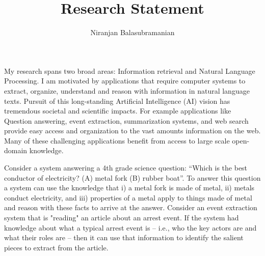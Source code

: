\documentclass[a4paper,11pt,onecolumn]{article}
\begin{document}

\title{Research Statement}
\author{Niranjan Balasubramanian}
\maketitle

My research spans two broad areas: Information retrieval and Natural Language Processing. I am motivated by applications that require computer systems to extract, organize, understand and reason with information in natural language texts. Pursuit of this long-standing Artificial Intelligence (AI) vision has tremendous societal and scientific impacts. For example applications like Question answering, event extraction, summarization systems, and web search provide easy access and organization to the vast amounts information on the web. Many of these challenging applications benefit from access to large scale open-domain knowledge.


Consider a system answering a 4th grade science question:  ``Which is the best conductor of electricity? (A) metal fork (B) rubber boat''. To answer this question a system can use the knowledge that i) a metal fork is made of metal, ii) metals conduct electricity, and iii) properties of a metal apply to things made of metal and reason with these facts to arrive at the answer. Consider an event extraction system that is "reading" an article about an arrest event. If the system had knowledge about what a typical arrest event is -- i.e., who the key actors are and what their roles are -- then it can use that information to identify the salient pieces to extract from the article. 
\end{document}
